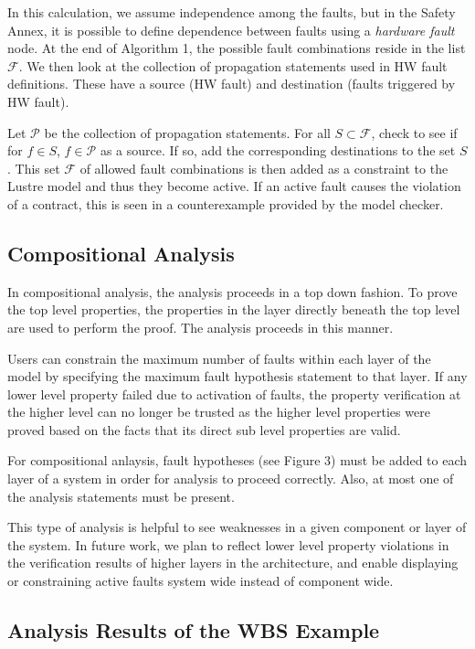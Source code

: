 In this calculation, we assume independence among the faults, but in the Safety Annex, it is possible to define dependence between faults using a \textit{hardware fault} node. At the end of Algorithm 1, the possible fault combinations reside in the list $\mathcal{F}$. We then look at the collection of propagation statements used in HW fault definitions. These have a source (HW fault) and destination (faults triggered by HW fault). 

Let $\mathcal{P}$ be the collection of propagation statements. For all $S \subset \mathcal{F}$, check to see if for $f \in S$, $f \in \mathcal{P}$ as a source. If so, add the corresponding destinations to the set $S$. This set $\mathcal{F}$ of allowed fault combinations is then added as a constraint to the Lustre model and thus they become active. If an active fault causes the violation of a contract, this is seen in a counterexample provided by the model checker.

\subsection{Compositional Analysis}
In compositional analysis, the analysis proceeds in a top down fashion. To prove the top level properties, the properties in the layer directly beneath the top level are used to perform the proof. The analysis proceeds in this manner.

 Users can constrain the maximum number of faults within each layer of the model by specifying the maximum fault hypothesis statement to that layer. If any lower level property failed due to activation of faults, the property verification at the higher level can no longer be trusted as the higher level properties were proved based on the facts that its direct sub level properties are valid.
 
For compositional anlaysis, fault hypotheses (see Figure 3) must be added to each layer of a system in order for analysis to proceed correctly. Also, at most one of the analysis statements must be present. 
 
 This type of analysis is helpful to see weaknesses in a given component or layer of the system. In future work, we plan to reflect lower level property violations in the verification results of higher layers in the architecture, and enable displaying or constraining active faults system wide instead of component wide.

\subsection{Analysis Results of the WBS Example}
\label{sec:results}

